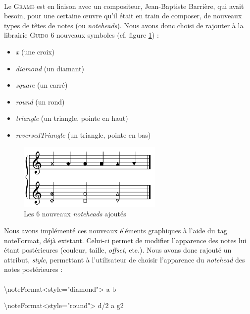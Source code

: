 \documentclass[a4paper,10pt,twocolumn]{article}
\newenvironment{code}
  {\fontfamily{pnc}\selectfont}{}
\begin{document}
\paragraph{}
Le \textsc{Grame} est en liaison avec un compositeur, Jean-Baptiste Barrière, qui avait besoin, pour une certaine œuvre qu'il était en train de composer, de nouveaux types de têtes de notes (ou \emph{noteheads}).
Nous avons donc choisi de rajouter à la librairie \textsc{Guido} 6 nouveaux symboles (cf. figure \ref{fig:noteheads}) :
%
\begin{itemize}
    \item \emph{x} (une croix)
    \item \emph{diamond} (un diamant)
    \item \emph{square} (un carré)
    \item \emph{round} (un rond)
    \item \emph{triangle} (un triangle, pointe en haut)
    \item \emph{reversedTriangle} (un triangle, pointe en bas)
\end{itemize} 
%
\begin{figure}[h]
\centering
\includegraphics[width=7cm]{img/partitions/noteheads.png}
\caption{Les 6 nouveaux \emph{noteheads} ajoutés}
\label{fig:noteheads}
\end{figure}
%
Nous avons implémenté ces nouveaux éléments graphiques à l'aide du tag \begin{code}noteFormat\end{code}, déjà existant. Celui-ci permet de modifier l'apparence des notes lui étant postérieures (couleur, taille, \emph{offset}, etc.). Nous avons donc rajouté un attribut, \emph{style}, permettant à l'utilisateur de choisir l'apparence du \emph{notehead} des notes postérieures :
%
\paragraph{}
\begin{code}
\textbackslash{}noteFormat\textless{}style="diamond"\textgreater{} a b

\textbackslash{}noteFormat\textless{}style="round"\textgreater{} d/2 a g2
\end{code}
\end{document}
